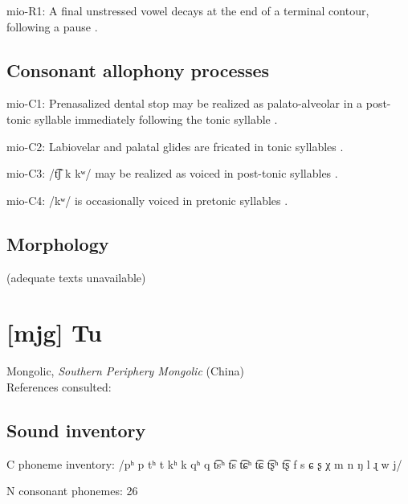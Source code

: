{\begin{appendixdesc}
\item[mio-R1:] A final unstressed vowel decays at the end of a terminal contour, following a pause \citep[13]{Bradley1970}.
\end{appendixdesc}
\subsection*{Consonant allophony processes}
\begin{appendixdesc}

\item[mio-C1:] Prenasalized dental stop may be realized as palato-alveolar in a post-tonic syllable immediately following the tonic syllable \citep[6]{Bradley1970}.

\item[mio-C2:] Labiovelar and palatal glides are fricated in tonic syllables \citep[8]{Bradley1970}.

\item[mio-C3:] /t͡ʃ k kʷ/ may be realized as voiced in post-tonic syllables \citep[5]{Bradley1970}.

\item[mio-C4:] /kʷ/ is occasionally voiced in pretonic syllables \citep[5]{Bradley1970}.
\end{appendixdesc}
\subsection*{Morphology}

(adequate texts unavailable)

\newpage\section*{[mjg] Tu}   %
Mongolic, \textit{Southern Periphery Mongolic} (China)\medskip\\
References consulted: \citet{Slater2003}

\subsection*{Sound inventory}
\begin{appendixdesc}

\item[C phoneme inventory:] /pʰ p tʰ t kʰ k qʰ q t͡sʰ t͡s t͡ɕʰ t͡ɕ t͡ʂʰ t͡ʂ f s ɕ ʂ χ m n ŋ l ɻ w j/

\item[N consonant phonemes:] 26


\end{appendixdesc}}
